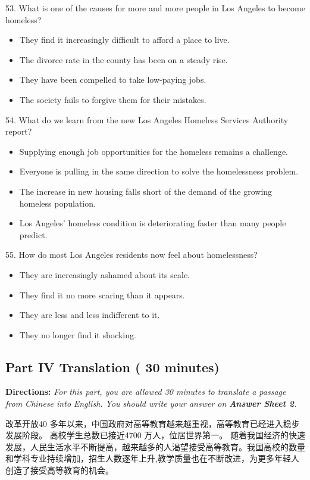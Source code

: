 \documentclass[UTF8,11pt]{ctexart}
\begin{document}
53. What is one of the causes for more and more people in Los Angeles to become homeless?


\begin{itemize}[leftmargin=2em,itemsep=.2em,topsep=.4em]\item[A.] They find it increasingly difficult to afford a place to live.
\item[B.] The divorce rate in the county has been on a steady rise.
\item[C.] They have been compelled to take low-paying jobs.
\item[D.] The society fails to forgive them for their mistakes.
\end{itemize}

54. What do we learn from the new Los Angeles Homeless Services Authority report?


\begin{itemize}[leftmargin=2em,itemsep=.2em,topsep=.4em]\item[A.] Supplying enough job opportunities for the homeless remains a challenge.
\item[B.] Everyone is pulling in the same direction to solve the homelessness problem.
\item[C.] The increase in new housing falls short of the demand of the growing homeless population.
\item[D.] Los Angeles’ homeless condition is deteriorating faster than many people predict.
\end{itemize}

55. How do most Los Angeles residents now feel about homelessness?


\begin{itemize}[leftmargin=2em,itemsep=.2em,topsep=.4em]\item[A.] They are increasingly ashamed about its scale.
\item[B.] They find it no more scaring than it appears.
\item[C.] They are less and less indifferent to it.
\item[D.] They no longer find it shocking.
\end{itemize}

\subsection*{\textbf{Part IV Translation} \textbf{( 30 minutes)}}


\textbf{Directions: }\textit{For this part, you are allowed 30 minutes to translate a passage from Chinese into} \textit{English. You should write your answer on }\textbf{\textit{Answer Sheet 2}}\textit{.}


改革开放40 多年以来，中国政府对高等教育越来越重视，高等教育已经进入稳步发展阶段。 高校学生总数已接近4700 万人，位居世界第一。 随着我国经济的快速发展，人民生活水平不断提高，越来越多的人渴望接受高等教育。我国高校的数量和学科专业持续增加，招生人数逐年上升,教学质量也在不断改进，为更多年轻人创造了接受高等教育的机会。
\end{document}
